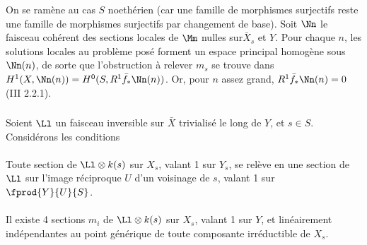 On se ramène au cas $S$ noethérien (car une famille de morphismes
surjectifs reste une famille de morphismes surjectifs par changement de
base).
Soit $\Nn$ le faisceau cohérent des sections locales
de $\Mm$ nulles sur\pageoriginale $\bar{X}_{s}$ et $Y$. Pour
chaque $n$, les solutions locales au problème posé forment un espace
principal homogène sous $\Nn(n)$, de sorte que l'obstruction à
relever $m_{s}$ se trouve dans
$H^{1}(X,\Nn(n))=H^{0}(S,R^{1}\bar{f}_{\ast}\Nn(n))$. Or,
pour $n$ assez grand, $R^{1}\bar{f}_{\ast}\Nn(n)=0$ (\EGA III 2.2.1).

\setcounter{subsubsection}{9}
\subsubsection{}
Soient $\Ll$ un faisceau inversible sur $\bar{X}$ trivialisé
le long de $Y$, et $s\in S$. Considérons les conditions

\paragraph{}
Toute section de $\Ll\otimes k(s)$ sur $X_{s}$, valant 1 sur
$Y_{s}$, se relève en une section de $\Ll$ sur l'image
réciproque $U$ d'un voisinage de $s$, valant 1 sur $\fprod{Y}{U}{S}$.

\paragraph{}
Il existe 4 sections $m_{i}$ de $\Ll\otimes k(s)$ sur $X_{s}$,
valant 1 sur $Y$, et linéairement indépendantes au point générique de
toute composante irréductible de $X_{s}$.


